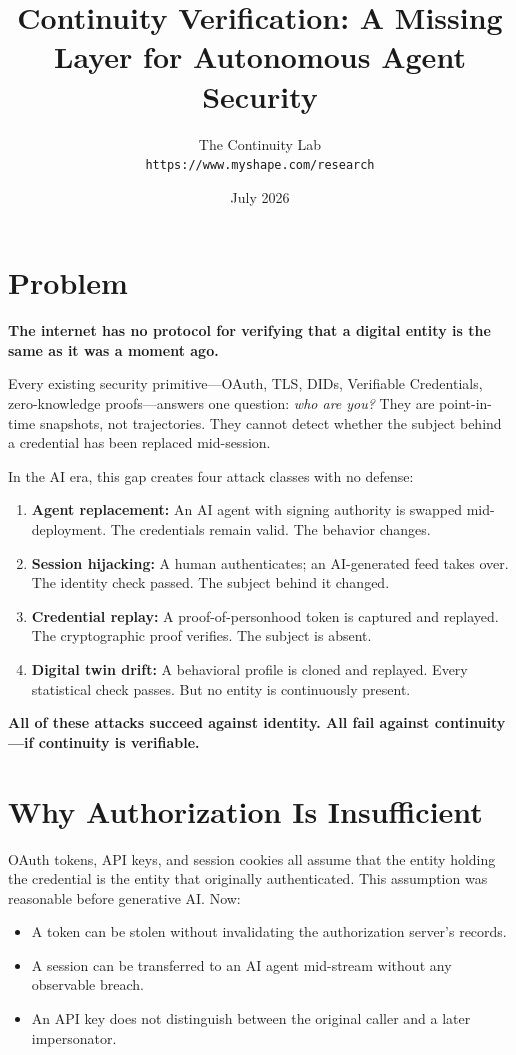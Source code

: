 \documentclass[10pt]{article}
\title{Continuity Verification: A Missing Layer for Autonomous Agent Security}
\author{The Continuity Lab\\
\small\texttt{https://www.myshape.com/research}}
\date{July 2026}
\begin{document}
\maketitle

\section*{Problem}

\textbf{The internet has no protocol for verifying that a digital entity is the same as it was a moment ago.}

Every existing security primitive---OAuth, TLS, DIDs, Verifiable Credentials, zero-knowledge proofs---answers one question: \textit{who are you?} They are point-in-time snapshots, not trajectories. They cannot detect whether the subject behind a credential has been replaced mid-session.

In the AI era, this gap creates four attack classes with no defense:

\begin{enumerate}
  \item \textbf{Agent replacement:} An AI agent with signing authority is swapped mid-deployment. The credentials remain valid. The behavior changes.
  \item \textbf{Session hijacking:} A human authenticates; an AI-generated feed takes over. The identity check passed. The subject behind it changed.
  \item \textbf{Credential replay:} A proof-of-personhood token is captured and replayed. The cryptographic proof verifies. The subject is absent.
  \item \textbf{Digital twin drift:} A behavioral profile is cloned and replayed. Every statistical check passes. But no entity is continuously present.
\end{enumerate}

\textbf{All of these attacks succeed against identity. All fail against continuity---if continuity is verifiable.}

\section*{Why Authorization Is Insufficient}

OAuth tokens, API keys, and session cookies all assume that the entity holding the credential is the entity that originally authenticated. This assumption was reasonable before generative AI. Now:

\begin{itemize}
  \item A token can be stolen without invalidating the authorization server's records.
  \item A session can be transferred to an AI agent mid-stream without any observable breach.
  \item An API key does not distinguish between the original caller and a later impersonator.
\end{itemize}
\end{document}
